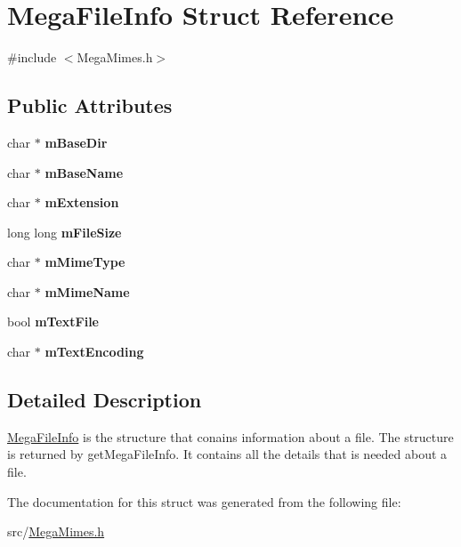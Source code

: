 \hypertarget{structMegaFileInfo}{}\section{Mega\+File\+Info Struct Reference}
\label{structMegaFileInfo}


{\ttfamily \#include $<$Mega\+Mimes.\+h$>$}

\subsection*{Public Attributes}
\begin{DoxyCompactItemize}
\item 
\mbox{\label{structMegaFileInfo_a9632a41d53c3866a7a2b835a9479b6a3}} 
char $\ast$ {\bfseries m\+Base\+Dir}
\item 
\mbox{\label{structMegaFileInfo_aee7b0f815f2d6d5bd4a2af287cbcb276}} 
char $\ast$ {\bfseries m\+Base\+Name}
\item 
\mbox{\label{structMegaFileInfo_adf9d0c4c3a07d74e170bc762373edee2}} 
char $\ast$ {\bfseries m\+Extension}
\item 
\mbox{\label{structMegaFileInfo_ac4ba306aaa247a4520438884dce9e5b2}} 
long long {\bfseries m\+File\+Size}
\item 
\mbox{\label{structMegaFileInfo_aac52815b96528671c36adc8c6f7c0745}} 
char $\ast$ {\bfseries m\+Mime\+Type}
\item 
\mbox{\label{structMegaFileInfo_ade7382973d9f3f8065fdf4d6b7ae3e7f}} 
char $\ast$ {\bfseries m\+Mime\+Name}
\item 
\mbox{\label{structMegaFileInfo_adebd5236c6db3b4d3a675f49b5523e02}} 
bool {\bfseries m\+Text\+File}
\item 
\mbox{\label{structMegaFileInfo_a745a8a1e18602570c8828c465aed79ad}} 
char $\ast$ {\bfseries m\+Text\+Encoding}
\end{DoxyCompactItemize}


\subsection{Detailed Description}
\hyperlink{structMegaFileInfo}{Mega\+File\+Info} is the structure that conains information about a file. The structure is returned by get\+Mega\+File\+Info. It contains all the details that is needed about a file. 

The documentation for this struct was generated from the following file\+:\begin{DoxyCompactItemize}
\item 
src/\hyperlink{MegaMimes_8h}{Mega\+Mimes.\+h}\end{DoxyCompactItemize}
